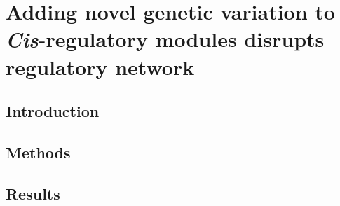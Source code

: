 \documentclass[../main.tex]{subfiles}
\begin{document}
\chapter{Adding novel genetic variation to \textit{Cis}\hyp{}regulatory modules disrupts regulatory network}
\label{chapter6}
\section{Introduction}
\label{chapter6:introduction}

\section{Methods}
\label{chapter6:methods}

\section{Results}
\label{chapter6:results}
\end{document}
